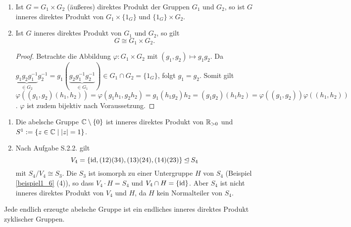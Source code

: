 \begin{rem}
	\begin{enumerate}[label=(\roman*)]\label{rem2_9}
		\item Ist $G = G_1 \times G_2$ (äußeres) direktes Produkt der Gruppen $G_1$ und $G_2$, so ist $G$ inneres direktes Produkt von $G_1 \times \{1_G\}$ und $\{1_G\} \times G_2$.
		
		\item Ist $G$ inneres direktes Produkt von $G_1$ und $G_2$, so gilt
		\[G \cong G_1 \times G_2.\]
		\begin{proof}
			Betrachte die Abbildung $\varphi \colon G_1 \times G_2$ mit $(g_1, g_2) \mapsto g_1g_2$. Da $\underbrace{g_1g_2g_1^{-1}}_{\in G_2}  g_2^{-1} = g_1(\underbrace{g_2g_1^{-1}g_2^{-1}}_{\in G_1}) \in G_1 \cap G_2 = \{1_G\}$, folgt $g_1 = g_2$. Somit gilt $\varphi((g_1, g_2) (h_1, h_2)) = \varphi(g_1h_1, g_2h_2) = g_1(h_1g_2)h_2 = (g_1g_2)(h_1h_2) = \varphi((g_1, g_2)) \varphi((h_1, h_2))$. $\varphi$ ist zudem bijektiv nach Voraussetzung.
		\end{proof}
	\end{enumerate}
\end{rem}
\begin{beispiel}
	\begin{enumerate}[label=(\arabic*)]
		\item Die abelsche Gruppe $\mathbb{C} \setminus \{0\}$ ist inneres direktes Produkt von $\mathbb{R}_{>0}$ und $S^1 := \{z \in \mathbb{C} \mid |z| = 1\}$.
		\item Nach Aufgabe S.2.2. gilt 
		\[V_4 = \{\mathrm{id}, (12)(34), (13)(24), (14)(23)\} \unlhd S_4\]
		mit $S_4/V_4 \cong S_3$. Die $S_3$ ist isomorph zu einer Untergruppe $H$ von $S_4$ (Beispiel \ref{beispiel1_6} (4)), so dass $V_4 \cdot H = S_4$ und $V_4 \cap H = \{\mathrm{id}\}$. Aber $S_4$ ist nicht inneres direktes Produkt von $V_4$ und $H$, da $H$ kein Normalteiler von $S_4$.
	\end{enumerate}
\end{beispiel}
\begin{thm}\label{thm2_11}
	Jede endlich erzeugte abelsche Gruppe ist ein endliches inneres direktes Produkt zyklischer Gruppen.
\end{thm}
